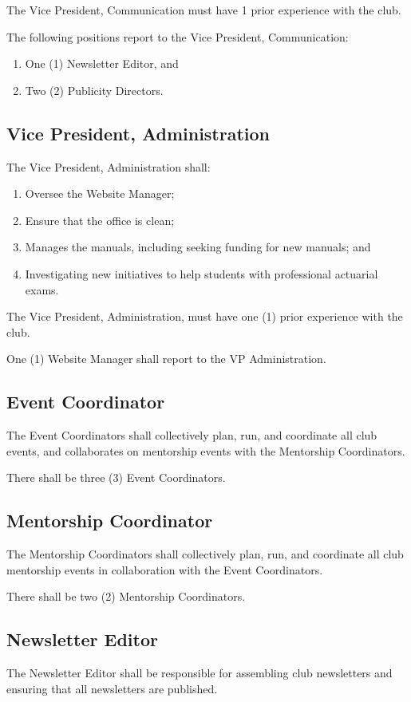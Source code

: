 \documentclass[11pt]{mathsoc}
\begin{document}
The Vice President, Communication must have 1 prior experience with the club.

The following positions report to the Vice President, Communication:
\begin{enumerate}
    \item One (1) Newsletter Editor, and
    \item Two (2) Publicity Directors.
\end{enumerate}

\subsection{Vice President, Administration}
The Vice President, Administration shall:
\begin{enumerate}
    \item Oversee the Website Manager; 
    \item Ensure that the office is clean; 
    \item Manages the manuals, including seeking funding for new manuals; 
        and
    \item Investigating new initiatives to help students with professional 
        actuarial exams. 
\end{enumerate}

The Vice President, Administration, must have one (1) prior experience with the club.

One (1) Website Manager shall report to the VP Administration.

\subsection{Event Coordinator} 

The Event Coordinators shall collectively plan, run, and coordinate all club 
events, and collaborates on mentorship events with the Mentorship Coordinators.

There shall be three (3) Event Coordinators.

\subsection{Mentorship Coordinator}
The Mentorship Coordinators shall collectively plan, run, and coordinate all 
club mentorship events in collaboration with the Event Coordinators.

There shall be two (2) Mentorship Coordinators.

\subsection{Newsletter Editor}
The Newsletter Editor shall be responsible for assembling club newsletters
and ensuring that all newsletters are published.
\end{document}
